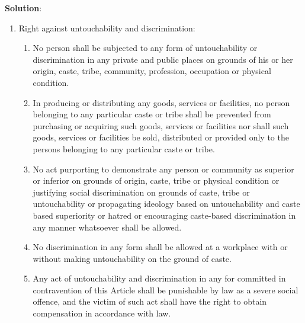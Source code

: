 \documentclass[
]{book}
\newenvironment{solution}{ {\bfseries Solution}:}{}
\begin{document}
\begin{questions}
\begin{solution}
\begin{enumerate}
\item Right against untouchability and discrimination:
\begin{enumerate}
\item No person shall be subjected to any form of untouchability or discrimination in any private and public places on grounds of his or her origin, caste, tribe, community, profession, occupation or physical condition.
\item In producing or distributing any goods, services or facilities, no person belonging to any particular caste or tribe shall be prevented from purchasing or acquiring such goods, services or facilities nor shall such goods, services or facilities be sold, distributed or provided only to the persons belonging to any particular caste or tribe.
\item No act purporting to demonstrate any person or community as superior or inferior on grounds of origin, caste, tribe or physical condition or justifying social discrimination on grounds of caste, tribe or untouchability or propagating ideology based on untouchability and caste based superiority or hatred or encouraging caste-based discrimination in any manner whatsoever shall be allowed.
\item No discrimination in any form shall be allowed at a workplace with or without making untouchability on the ground of caste.
\item Any act of untouchability and discrimination in any for committed in contravention of this Article shall be punishable by law as a severe social offence, and the victim of such act shall have the right to obtain compensation in accordance with law.
\end{enumerate}


\end{enumerate}
\end{solution}
\end{questions}
\end{document}
